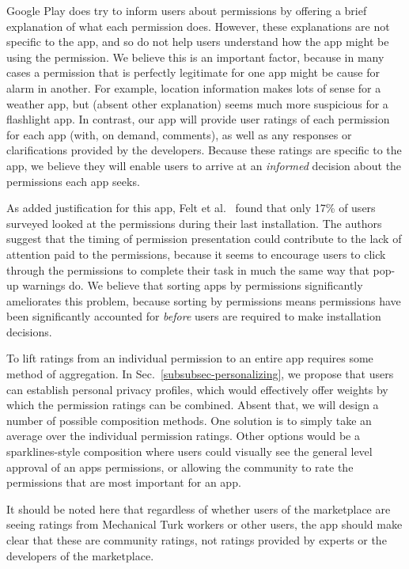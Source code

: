 \documentclass[11pt]{article}
\begin{document}
Google Play does try to inform users about permissions by offering a
brief explanation of what each permission does. However, these
explanations are not specific to the app, and so do not help
users understand how the app might be using the permission. We
believe this is an important factor, because in many cases a
permission that is perfectly legitimate for one app might be cause for
alarm in another. For example, location information makes lots of
sense for a weather app, but (absent other explanation) seems much
more suspicious for a flashlight app. In contrast, our app will
provide user ratings of each permission for each app (with, on demand,
comments), as well as any responses or clarifications provided by the
developers. Because these ratings are specific to the app, we believe
they will enable users to arrive at an \emph{informed} decision about
the permissions each app seeks.

As added justification for this app, Felt et al.\ \cite{android-attention-SOUPS12} 
found that only 17\% of users surveyed looked at the permissions during
their last installation. The authors suggest that the timing of
permission presentation could contribute to the lack of attention paid
to the permissions, because it seems to encourage users to click
through the permissions to complete their task in much the same way
that pop-up warnings do. We believe that sorting apps by permissions
significantly ameliorates this problem, because sorting by permissions
means permissions have been significantly accounted for \emph{before}
users are required to make installation decisions.

To lift ratings from an individual permission to an entire app
requires some method of aggregation. In 
Sec.~\ref{subsubsec-personalizing}, we propose that users
can establish personal privacy profiles, which would effectively offer
weights by which the permission ratings can be combined. Absent that, we will design a
number of possible composition methods. One solution is to simply take
an average over the individual permission ratings. Other options would
be a sparklines-style composition where users could visually see the
general level approval of an apps permissions, or allowing the
community to rate the permissions that are most important for an app.

It should be noted here that regardless of whether users of the
marketplace are seeing ratings from Mechanical Turk workers or other
users, the app should make clear that these are community ratings, not
ratings provided by experts or the developers of the marketplace.
\end{document}
